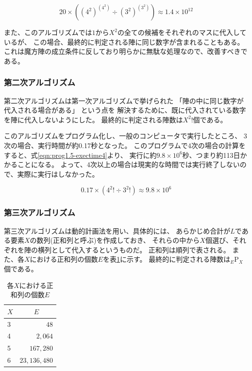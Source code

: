 \begin{equation} \label{eqn:prog1-exectime4}
20 \times ((4^2)^{(4^2)} \div (3^2)^{(3^2)}) \approx 1.4 \times 10^{12}
\end{equation}

また、このアルゴリズムでは$1$から$X^2$の全ての候補をそれぞれのマスに代入しているが、
この場合、最終的に判定される陣に同じ数字が含まれることもある。
これは魔方陣の成立条件に反しており明らかに無駄な処理なので、改善すべきである。


\subsubsection{第二次アルゴリズム}
第二次アルゴリズムは第一次アルゴリズムで挙げられた
「陣の中に同じ数字が代入される場合がある」
という点を
解決するために、既に代入されている数字を陣に代入しないようにした。
最終的に判定される陣数は$X^2!$個である。

このアルゴリズムをプログラム化し、一般のコンピュータで実行したところ、
3次の場合、実行時間が約0.17秒となった。
このプログラムで4次の場合の計算をすると、式\ref{eqn:prog1.5-exectime4}より、
実行に約$9.8 \times 10^6$秒、つまり約113日かかることになる。
よって、4次以上の場合は現実的な時間では実行終了しないので、実際に実行はしなかった。

\begin{equation} \label{eqn:prog1.5-exectime4}
0.17 \times (4^2! \div 3^2!) \approx 9.8 \times 10^6
\end{equation}

\subsubsection{第三次アルゴリズム}
第三次アルゴリズムは動的計画法を用い、具体的には、
あらかじめ合計が$L$である要素$X$の数列(正和列と呼ぶ)を作成しておき、
それらの中から$X$個選び、それぞれを陣の横列として代入するというものだ。
正和列は順列で表される。
また、各$X$における正和列の個数$E$を表\ref{tab:ple-each-X}に示す。
最終的に判定される陣数は$_E \mathrm{P} _X$個である。

\begin{table}[htb]
	\begin{center}
	\begin{tabular}{|l|r|}
\hline \hline
\multicolumn{1}{|c|}{$X$} & \multicolumn{1}{|c|}{$E$} \\
\hline \hline
3 & $48$ \\
4 & $2,064$ \\
5 & $167,280$ \\
6 & $23,136,480$ \\
\hline
	\end{tabular}
	\end{center}
	\caption{各$X$における正和列の個数$E$}
	\label{tab:ple-each-X}
\end{table}

